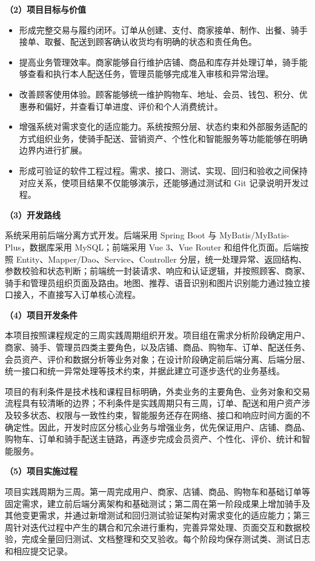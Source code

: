 \textbf{（2）项目目标与价值}

\begin{itemize}
\item 形成完整交易与履约闭环。订单从创建、支付、商家接单、制作、出餐、骑手接单、取餐、配送到顾客确认收货均有明确的状态和责任角色。
\item 提高业务管理效率。商家能够自行维护店铺、商品和库存并处理订单，骑手能够查看和执行本人配送任务，管理员能够完成准入审核和异常治理。
\item 改善顾客使用体验。顾客能够统一维护购物车、地址、会员、钱包、积分、优惠券和偏好，并查看订单进度、评价和个人消费统计。
\item 增强系统对需求变化的适应能力。系统按照分层、状态约束和外部服务适配的方式组织业务，使骑手配送、营销资产、个性化和智能服务等功能能够在明确边界内进行扩展。
\item 形成可验证的软件工程过程。需求、接口、测试、实现、回归和验收之间保持对应关系，使项目结果不仅能够演示，还能够通过测试和 Git 记录说明开发过程。
\end{itemize}

\textbf{（3）开发路线}

系统采用前后端分离方式开发。后端采用 Spring Boot 与 MyBatis/MyBatis-Plus，数据库采用 MySQL；前端采用 Vue 3、Vue Router 和组件化页面。后端按照 Entity、Mapper/Dao、Service、Controller 分层，统一处理异常、返回结构、参数校验和状态判断；前端统一封装请求、响应和认证逻辑，并按照顾客、商家、骑手和管理员组织页面及路由。地图、推荐、语音识别和图片识别能力通过独立接口接入，不直接写入订单核心流程。

\textbf{（4）项目开发条件}

本项目按照课程规定的三周实践周期组织开发。项目组在需求分析阶段确定用户、商家、骑手、管理员四类主要角色，以及店铺、商品、购物车、订单、配送任务、会员资产、评价和数据分析等业务对象；在设计阶段确定前后端分离、后端分层、统一接口和统一异常处理等技术约束，并据此建立可逐步迭代的业务基线。

项目的有利条件是技术栈和课程目标明确，外卖业务的主要角色、业务对象和交易流程具有较清晰的边界；不利条件是实践周期只有三周，订单、配送和用户资产涉及较多状态、权限与一致性约束，智能服务还存在网络、接口和响应时间方面的不确定性。因此，开发时应区分核心业务与增强业务，优先保证用户、店铺、商品、购物车、订单和骑手配送主链路，再逐步完成会员资产、个性化、评价、统计和智能服务。

\textbf{（5）项目实施过程}

项目实践周期为三周。第一周完成用户、商家、店铺、商品、购物车和基础订单等固定需求，建立前后端分离架构和基础测试；第二周在第一阶段成果上增加骑手及其他变更需求，并通过新增测试和回归测试验证架构对需求变化的适应能力；第三周针对迭代过程中产生的耦合和冗余进行重构，完善异常处理、页面交互和数据校验，完成全量回归测试、文档整理和交叉验收。每个阶段均保存测试类、测试日志和相应提交记录。

